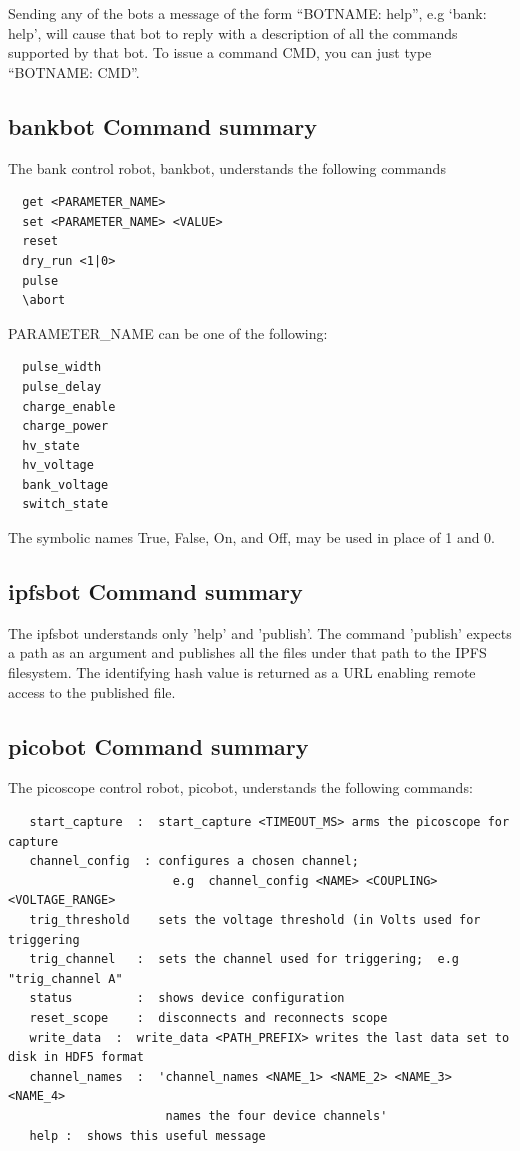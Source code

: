 Sending any of the bots a message of the form ``BOTNAME: help'', e.g `bank: help', will cause
that bot to reply with a description of all the commands supported by that bot. To issue a command CMD, you can just type ``BOTNAME: CMD''.

\subsection{bankbot Command summary}

The bank control robot, bankbot, understands the following commands
\begin{verbatim}
  get <PARAMETER_NAME>
  set <PARAMETER_NAME> <VALUE>
  reset
  dry_run <1|0>
  pulse
  \abort
\end{verbatim}

PARAMETER\_NAME can be one of the following:
\begin{verbatim}
  pulse_width
  pulse_delay
  charge_enable
  charge_power
  hv_state
  hv_voltage
  bank_voltage
  switch_state
\end{verbatim}

The symbolic names True, False, On, and Off, may be used in place of 1 and 0.

\subsection{ipfsbot Command summary}

The ipfsbot understands only 'help' and 'publish'. The command 'publish' expects a path
as an argument and publishes all the files under that path to the IPFS filesystem. The
identifying hash value is returned as a URL enabling remote access to the published file.

\subsection{picobot Command summary}

The picoscope control robot, picobot, understands the following commands:

\small{
\begin{verbatim}
   start_capture  :  start_capture <TIMEOUT_MS> arms the picoscope for capture
   channel_config  : configures a chosen channel;
                       e.g  channel_config <NAME> <COUPLING> <VOLTAGE_RANGE>
   trig_threshold    sets the voltage threshold (in Volts used for triggering
   trig_channel   :  sets the channel used for triggering;  e.g "trig_channel A"  
   status         :  shows device configuration
   reset_scope    :  disconnects and reconnects scope
   write_data  :  write_data <PATH_PREFIX> writes the last data set to disk in HDF5 format  
   channel_names  :  'channel_names <NAME_1> <NAME_2> <NAME_3> <NAME_4> 
                      names the four device channels'
   help :  shows this useful message
\end{verbatim}
}


